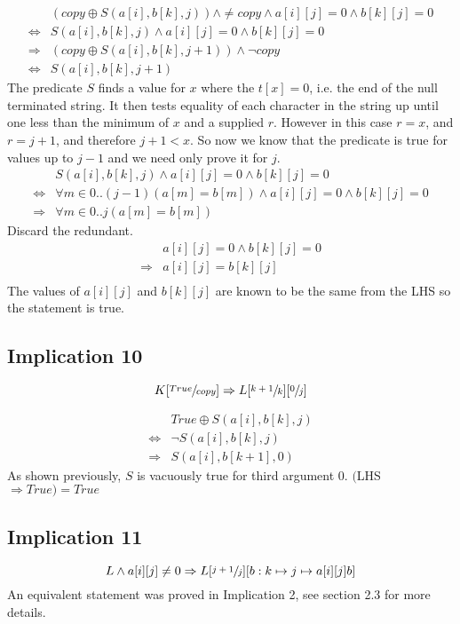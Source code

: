 \documentclass[a4paper]{article}
\begin{document}
\begin{align*}
		& (copy \oplus S(a[i], b[k], j)) \land \neq copy \land a[i][j] = 0 \land b[k][j] = 0 \\
		\Leftrightarrow & S(a[i], b[k], j) \land a[i][j] = 0 \land b[k][j] = 0 \\
		\Rightarrow & (copy \oplus S(a[i], b[k], j+1)) \land \neg copy \\
		\Leftrightarrow & S(a[i], b[k], j+1)
\end{align*}
The predicate $S$ finds a value for $x$ where the $t[x] = 0$, i.e. the end of the null terminated string. It then tests equality of each character in the string up until one less than the minimum of $x$ and a supplied $r$. However in this case $r=x$, and $r=j+1$, and therefore $j+1 < x$. So now we know that the predicate is true for values up to $j-1$ and we need only prove it for $j$.
\begin{align*}
		& S(a[i], b[k], j) \land a[i][j] = 0 \land b[k][j] = 0 \\
		\Leftrightarrow & \forall m \in 0..(j-1)(a[m] = b[m]) \land a[i][j] = 0 \land b[k][j] = 0 \\
		\Rightarrow & \forall m \in 0..j(a[m] = b[m])
\end{align*}
Discard the redundant.
\begin{align*}
		& a[i][j] = 0 \land b[k][j] = 0 \\
		\Rightarrow & a[i][j] = b[k][j] \\
\end{align*}
The values of $a[i][j]$ and $b[k][j]$ are known to be the same from the LHS so the statement is true.





\subsection{Implication 10}
$$ K[\sfrac{True}{copy}] \Rightarrow L[\sfrac{k+1}{k}][\sfrac{0}{j}] $$

\begin{align*}
		& True \oplus S(a[i], b[k], j) \\
		\Leftrightarrow & \neg S(a[i], b[k], j) \\
		\Rightarrow & S(a[i], b[k+1], 0)
\end{align*}
As shown previously, $S$ is vacuously true for third argument 0. $($LHS$ \Rightarrow True) = True$

\subsection{Implication 11}
$$ L \land a[i][j] \neq 0 \Rightarrow L[\sfrac{j+1}{j}][{b:k\mapsto j \mapsto a[i][j]}{b}] $$
An equivalent statement was proved in Implication 2, see section 2.3 for more details. 
\end{document}
